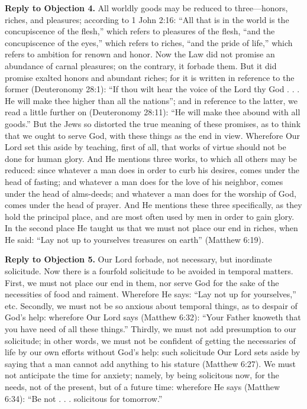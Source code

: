\textbf{Reply to Objection 4.} All worldly goods may be reduced to three—honors, riches, and pleasures; according to 1 John 2:16: ``All that is in the world is the concupiscence of the flesh,'' which refers to pleasures of the flesh, ``and the concupiscence of the eyes,'' which refers to riches, ``and the pride of life,'' which refers to ambition for renown and honor. Now the Law did not promise an abundance of carnal pleasures; on the contrary, it forbade them. But it did promise exalted honors and abundant riches; for it is written in reference to the former (Deuteronomy 28:1): ``If thou wilt hear the voice of the Lord thy God . . . He will make thee higher than all the nations''; and in reference to the latter, we read a little further on (Deuteronomy 28:11): ``He will make thee abound with all goods.'' But the Jews so distorted the true meaning of these promises, as to think that we ought to serve God, with these things as the end in view. Wherefore Our Lord set this aside by teaching, first of all, that works of virtue should not be done for human glory. And He mentions three works, to which all others may be reduced: since whatever a man does in order to curb his desires, comes under the head of fasting; and whatever a man does for the love of his neighbor, comes under the head of alms-deeds; and whatever a man does for the worship of God, comes under the head of prayer. And He mentions these three specifically, as they hold the principal place, and are most often used by men in order to gain glory. In the second place He taught us that we must not place our end in riches, when He said: ``Lay not up to yourselves treasures on earth'' (Matthew 6:19).

\textbf{Reply to Objection 5.} Our Lord forbade, not necessary, but inordinate solicitude. Now there is a fourfold solicitude to be avoided in temporal matters. First, we must not place our end in them, nor serve God for the sake of the necessities of food and raiment. Wherefore He says: ``Lay not up for yourselves,'' etc. Secondly, we must not be so anxious about temporal things, as to despair of God's help: wherefore Our Lord says (Matthew 6:32): ``Your Father knoweth that you have need of all these things.'' Thirdly, we must not add presumption to our solicitude; in other words, we must not be confident of getting the necessaries of life by our own efforts without God's help: such solicitude Our Lord sets aside by saying that a man cannot add anything to his stature (Matthew 6:27). We must not anticipate the time for anxiety; namely, by being solicitous now, for the needs, not of the present, but of a future time: wherefore He says (Matthew 6:34): ``Be not . . . solicitous for tomorrow.''

